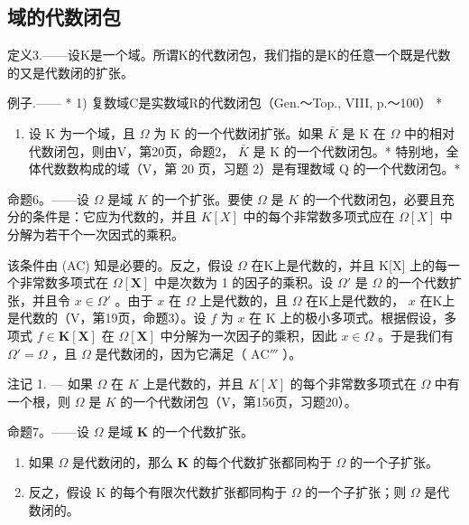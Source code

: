 \subsection{域的代数闭包}

定义3.——设K是一个域。所谓K的代数闭包，我们指的是K的任意一个既是代数的又是代数闭的扩张。

例子.—— * 1) 复数域C是实数域R的代数闭包（Gen.～Top., VIII, p.～100） *

\begin{enumerate}
\def\labelenumi{\arabic{enumi})}
\setcounter{enumi}{1}
\tightlist
\item
  设 K 为一个域，且 \(\Omega\) 为 K 的一个代数闭扩张。如果 \(\bar{K}\) 是 K 在 \(\Omega\) 中的相对代数闭包，则由V，第20页，命题2， \(\bar{K}\) 是 K 的一个代数闭包。* 特别地，全体代数数构成的域（V，第 20 页，习题 2）是有理数域 Q 的一个代数闭包。*
\end{enumerate}

命题6。——设 \(\Omega\) 是域 \(K\) 的一个扩张。要使 \(\Omega\) 是 \(K\) 的一个代数闭包，必要且充分的条件是：它应为代数的，并且 \(K[X]\) 中的每个非常数多项式应在 \(\Omega[X]\) 中分解为若干个一次因式的乘积。

该条件由 (AC) 知是必要的。反之，假设 \(\Omega\) 在K上是代数的，并且 K{[}X{]} 上的每一个非常数多项式在 \(\Omega[\mathbf{X}]\) 中是次数为 1 的因子的乘积。设 \(\Omega'\) 是 \(\Omega\) 的一个代数扩张，并且令 \(x \in \Omega'\) 。由于 \(x\) 在 \(\Omega\) 上是代数的，且 \(\Omega\) 在K上是代数的， \(x\) 在K上是代数的（V，第19页，命题3）。设 \(f\) 为 \(x\) 在 K 上的极小多项式。根据假设，多项式 \(f \in \mathbf{K}[\mathbf{X}]\) 在 \(\Omega[\mathbf{X}]\) 中分解为一次因子的乘积，因此 \(x \in \Omega\) 。于是我们有 \(\Omega' = \Omega\) ，且 \(\Omega\) 是代数闭的，因为它满足（ \(\mathrm{AC}'''\) ）。

注记 1. --- 如果 \(\Omega\) 在 \(K\) 上是代数的，并且 \(K[X]\) 的每个非常数多项式在 \(\Omega\) 中有一个根，则 \(\Omega\) 是 \(K\) 的一个代数闭包（V，第156页，习题20）。

命题7。——设 \(\Omega\) 是域 \(\mathbf{K}\) 的一个代数扩张。

\begin{enumerate}
\def\labelenumi{\alph{enumi})}
\item
  如果 \(\Omega\) 是代数闭的，那么 \(\mathbf{K}\) 的每个代数扩张都同构于 \(\Omega\) 的一个子扩张。
\item
  反之，假设 K 的每个有限次代数扩张都同构于 \(\Omega\) 的一个子扩张；则 \(\Omega\) 是代数闭的。
\end{enumerate}

